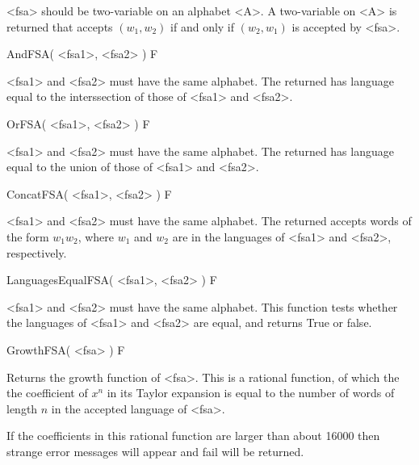 <fsa> should be two-variable {\fsa} on an alphabet <A>. A
two-variable {\fsa} on <A> is returned that accepts $(w_1,w_2)$ if and
only if $(w_2,w_1)$ is accepted by <fsa>.

\>AndFSA( <fsa1>, <fsa2> ) F

<fsa1> and <fsa2> must have the same alphabet. The returned {\fsa} has
language equal to the interssection of those of <fsa1> and <fsa2>.

\>OrFSA( <fsa1>, <fsa2> ) F

<fsa1> and <fsa2> must have the same alphabet. The returned {\fsa} has
language equal to the union of those of <fsa1> and <fsa2>.

\>ConcatFSA( <fsa1>, <fsa2> ) F

<fsa1> and <fsa2> must have the same alphabet. The returned {\fsa} accepts
words of the form $w_1w_2$, where $w_1$ and $w_2$ are in the languages of
<fsa1> and <fsa2>, respectively.

\>LanguagesEqualFSA( <fsa1>, <fsa2> ) F

<fsa1> and <fsa2> must have the same alphabet. This function tests
whether the languages of <fsa1> and <fsa2> are equal, and
returns True or false.

\>GrowthFSA( <fsa> ) F

Returns the growth function of <fsa>. This is a rational function, of which
the the coefficient of $x^n$ in its Taylor expansion is equal to the number
of words of length $n$ in the accepted language of <fsa>.

If the coefficients in this rational function are larger than about 16000
then strange error messages will appear and fail will be returned.
